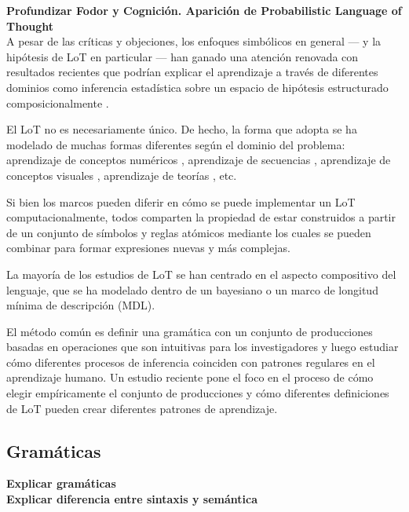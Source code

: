 \textbf{Profundizar Fodor y Cognición. Aparición de Probabilistic Language of Thought}\\

A pesar de las críticas y objeciones, los enfoques simbólicos en general --- y la hipótesis de LoT en particular --- han ganado una atención renovada con resultados recientes que podrían explicar el aprendizaje a través de diferentes dominios como inferencia estadística sobre un espacio de hipótesis estructurado composicionalmente \cite{tenenbaum2011grow, piantadosi2016four}.

El LoT no es necesariamente único. De hecho, la forma que adopta se ha modelado de muchas formas diferentes según el dominio del problema: aprendizaje de conceptos numéricos \cite{piantadosi2012bootstrapping}, aprendizaje de secuencias \cite{marie2016, yildirim2015learning, romano2013language}, aprendizaje de conceptos visuales \cite{ellis2015unsupervised}, aprendizaje de teorías \cite{ullman2012theory}, etc.

Si bien los marcos pueden diferir en cómo se puede implementar un LoT computacionalmente, todos comparten la propiedad de estar construidos a partir de un conjunto de símbolos y reglas atómicos mediante los cuales se pueden combinar para formar expresiones nuevas y más complejas. 

La mayoría de los estudios de LoT se han centrado en el aspecto compositivo del lenguaje, que se ha modelado dentro de un \cite{tenenbaum2011grow} bayesiano o un marco \cite{marie2016, goldsmith2002probabilistic, romano2013language, goldsmith2001unsupervised} de longitud mínima de descripción (MDL).

El método común es definir una gramática con un conjunto de producciones basadas en operaciones que son intuitivas para los investigadores y luego estudiar cómo diferentes procesos de inferencia coinciden con patrones regulares en el aprendizaje humano. Un estudio reciente \cite{piantadosi2016logical} pone el foco en el proceso de cómo elegir empíricamente el conjunto de producciones y cómo diferentes definiciones de LoT pueden crear diferentes patrones de aprendizaje. 


\subsection{Gramáticas}


\textbf{Explicar gramáticas}\\
\textbf{Explicar diferencia entre sintaxis y semántica}\\

